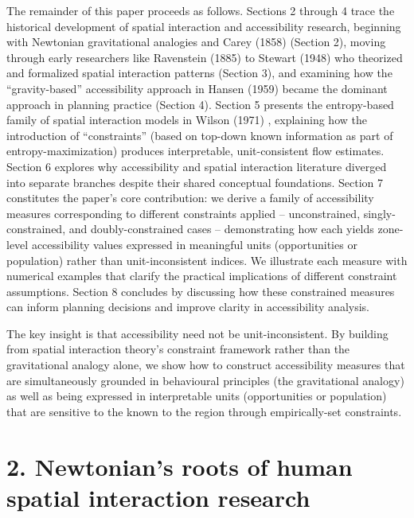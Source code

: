 \documentclass[
  10pt,
  letterpaper,
]{article}
\begin{document}
The remainder of this paper proceeds as follows. Sections 2 through 4
trace the historical development of spatial interaction and
accessibility research, beginning with Newtonian gravitational analogies
and Carey (1858) \citep{careyPrinciplesSocialScience1858} (Section 2),
moving through early researchers like Ravenstein (1885)
\citep{ravensteinLawsMigration1885} to Stewart (1948)
\citep{stewartDemographicGravitationEvidence1948} who theorized and
formalized spatial interaction patterns (Section 3), and examining how
the ``gravity-based'' accessibility approach in Hansen (1959)
\citep{hansen1959} became the dominant approach in planning practice
(Section 4). Section 5 presents the entropy-based family of spatial
interaction models in Wilson (1971) \citep{wilson1971}, explaining how
the introduction of ``constraints'' (based on top-down known information
as part of entropy-maximization) produces interpretable, unit-consistent
flow estimates. Section 6 explores why accessibility and spatial
interaction literature diverged into separate branches despite their
shared conceptual foundations. Section 7 constitutes the paper's core
contribution: we derive a family of accessibility measures corresponding
to different constraints applied -- unconstrained, singly-constrained,
and doubly-constrained cases -- demonstrating how each yields zone-level
accessibility values expressed in meaningful units (opportunities or
population) rather than unit-inconsistent indices. We illustrate each
measure with numerical examples that clarify the practical implications
of different constraint assumptions. Section 8 concludes by discussing
how these constrained measures can inform planning decisions and improve
clarity in accessibility analysis.

The key insight is that accessibility need not be unit-inconsistent. By
building from spatial interaction theory's constraint framework rather
than the gravitational analogy alone, we show how to construct
accessibility measures that are simultaneously grounded in behavioural
principles (the gravitational analogy) as well as being expressed in
interpretable units (opportunities or population) that are sensitive to
the known to the region through empirically-set constraints.

\section{2. Newtonian's roots of human spatial interaction
research}\label{newtonians-roots-of-human-spatial-interaction-research}
\end{document}
